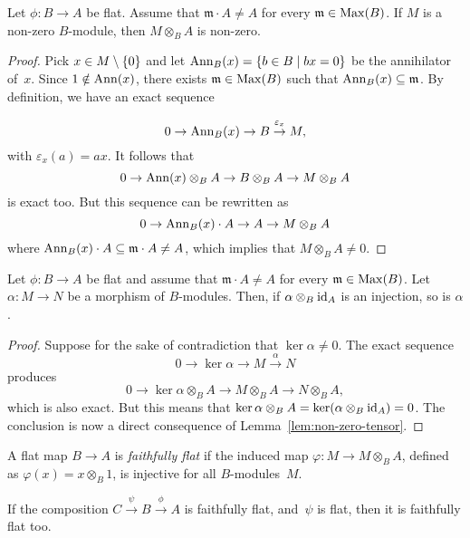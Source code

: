 \begin{lem}\label{lem:non-zero-tensor}
    Let\/ $\phi\colon B\to A$ be flat. Assume that\/ $\mathfrak m \cdot A\ne A$ for every\/ $\mathfrak m\in\operatorname{Max}(B)$. If\/ $M$ is a non-zero\/ $B$-module, then\/ $M \otimes_B A$ is non-zero.
\end{lem}

\begin{proof}
    Pick $x\in M\setminus\{0\}$ and let $\operatorname{Ann}_B(x)=\{b\in B\mid bx=0\}$ be the annihilator of~$x$. Since $1\notin\operatorname{Ann}(x)$, there exists $\mathfrak m\in\operatorname{Max}(B)$ such that $\operatorname{Ann}_B(x)\subseteq\mathfrak m$. By definition, we have an exact sequence
    $$
        0\to\operatorname{Ann}_B(x)\to B\stackrel{\vphantom{\big|}\varepsilon_x}\to M,
    $$
    with $\varepsilon_x(a)=ax$. It follows that
    $$
        0\to\operatorname{Ann}(x)\otimes_BA\to B\otimes_BA\to M\otimes_BA
    $$
    is exact too. But this sequence can be rewritten as
    $$
        0\to\operatorname{Ann}_B(x)\cdot A\to A\to M\otimes_BA
    $$
    where $\operatorname{Ann}_B(x)\cdot A\subseteq\mathfrak m\cdot A\ne A$, which implies that $M\otimes_BA\ne0$.
\end{proof}

\begin{lem}\label{lem:flat-converse}
    Let\/ $\phi\colon B\to A$ be flat and assume that\/ $\mathfrak m\cdot A\ne A$ for every\/ $\mathfrak m\in\operatorname{Max}(B)$. Let\/ $\alpha\colon M \to N$ be a morphism of\/ $B$-modules. Then, if\/ $\alpha\otimes_B\text{\rm id}_A$ is an injection, so is\/ $\alpha$.
\end{lem}

\begin{proof}
    Suppose for the sake of contradiction that $\ker\alpha\ne0$. The exact sequence
    $$
        0\to\ker\alpha\to M\stackrel{\alpha}\to N
    $$
    produces
    $$
        0\to\ker\alpha\otimes_BA\to M\otimes_BA\to N\otimes_BA,
    $$
    which is also exact. But this means that $\ker\alpha\otimes_BA = \ker(\alpha\otimes_B\text{\rm id}_A) = 0$. The conclusion is now a direct consequence of Lemma~\ref{lem:non-zero-tensor}.
\end{proof}

\begin{defn}\label{defn:faithfully-flat}
    A flat map $B \to A$ is \textsl{faithfully flat} if the induced map $\varphi\colon M \to M \otimes_B A$, defined as $\varphi(x)=x \otimes_B1$, is injective for all $B$-modules~$M$.
\end{defn}

\begin{prop}\label{prop:phi-psi-ff-implies-psi-ff}
    If the composition\/ $C\stackrel\psi\to B\stackrel\phi\to A$ is faithfully flat, and\/~$\psi$ is flat, then\/ it is faithfully flat too.
\end{prop}

